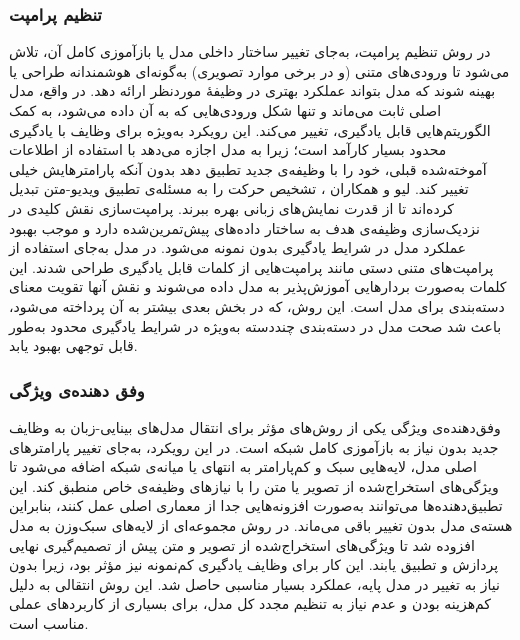 \subsubsection{تنظیم پرامپت}
در روش تنظیم پرامپت، به‌جای تغییر ساختار داخلی مدل یا بازآموزی کامل آن، تلاش می‌شود تا ورودی‌های متنی (و در برخی موارد تصویری) به‌گونه‌ای هوشمندانه طراحی یا بهینه شوند که مدل بتواند عملکرد بهتری در وظیفۀ موردنظر ارائه دهد. در واقع، مدل اصلی ثابت می‌ماند و تنها شکل ورودی‌هایی که به آن داده می‌شود، به کمک الگوریتم‌هایی قابل یادگیری، تغییر می‌کند. این رویکرد به‌ویژه برای وظایف با یادگیری محدود بسیار کارآمد است؛ زیرا به مدل اجازه می‌دهد با استفاده از اطلاعات آموخته‌شده قبلی، خود را با وظیفه‌ی جدید تطبیق دهد بدون آنکه پارامتر‌هایش خیلی تغییر کند. لیو و همکاران 
\cite{actionclip}،
تشخیص حرکت را به مسئله‌ی تطبیق ویدیو-متن تبدیل کرده‌اند تا از قدرت نمایش‌های زبانی بهره ببرند. پرامپت‌سازی نقش کلیدی در نزدیک‌سازی وظیفه‌ی هدف به ساختار داده‌های پیش‌تمرین‌شده دارد و موجب بهبود عملکرد مدل در شرایط یادگیری بدون نمونه می‌شود. در مدل 
\cite{CoOp}
به‌جای استفاده از پرامپت‌های متنی دستی مانند
پرامپت‌هایی از کلمات قابل یادگیری طراحی شدند. این کلمات به‌صورت بردارهایی آموزش‌پذیر به مدل داده می‌شوند و نقش آنها تقویت معنای دسته‌بندی برای مدل است. این روش، که در بخش بعدی بیشتر به آن پرداخته می‌شود، باعث شد صحت مدل
در دسته‌بندی چند‌دسته به‌ویژه در شرایط یادگیری محدود به‌طور قابل توجهی بهبود یابد. 

\subsubsection{وفق دهنده‌ی ویژگی}
وفق‌دهنده‌ی ویژگی یکی از روش‌های مؤثر برای انتقال مدل‌های بینایی-زبان به وظایف جدید بدون نیاز به بازآموزی کامل شبکه است. در این رویکرد، به‌جای تغییر پارامتر‌های اصلی مدل، لایه‌هایی سبک و کم‌پارامتر به انتهای یا میانه‌ی شبکه اضافه می‌شود تا ویژگی‌های استخراج‌شده از تصویر یا متن را با نیازهای وظیفه‌ی خاص منطبق کند. این تطبیق‌دهنده‌ها  می‌توانند به‌صورت افزونه‌هایی جدا از معماری اصلی عمل کنند، بنابراین هسته‌ی مدل بدون تغییر باقی می‌ماند. در روش 
\cite{CLIP-Adapter}
مجموعه‌ای از لایه‌های سبک‌وزن به مدل
افزوده شد تا ویژگی‌های استخراج‌شده از تصویر و متن پیش از تصمیم‌گیری نهایی پردازش و تطبیق یابند. این کار برای وظایف یادگیری کم‌نمونه نیز مؤثر بود، زیرا بدون نیاز به تغییر در مدل پایه، عملکرد بسیار مناسبی حاصل شد. این روش انتقالی به دلیل کم‌هزینه بودن و عدم نیاز به تنظیم مجدد کل مدل، برای بسیاری از کاربردهای عملی مناسب است.

